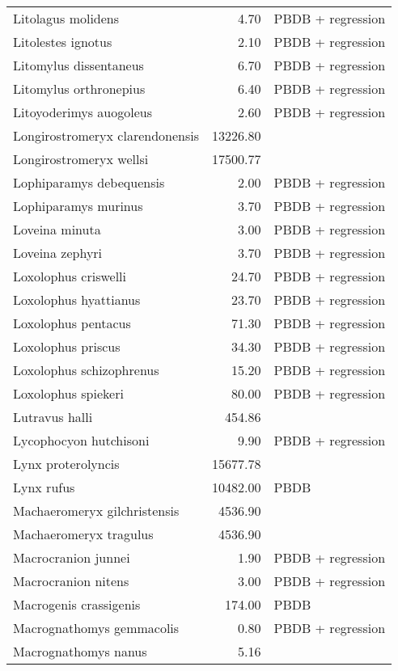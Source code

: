 \begin{table}[ht]
\begin{tabular}{lrl}
  Litolagus molidens & 4.70 & PBDB + regression \\ 
  Litolestes ignotus & 2.10 & PBDB + regression \\ 
  Litomylus dissentaneus & 6.70 & PBDB + regression \\ 
  Litomylus orthronepius & 6.40 & PBDB + regression \\ 
  Litoyoderimys auogoleus & 2.60 & PBDB + regression \\ 
  Longirostromeryx clarendonensis & 13226.80 & \cite{Tomiya2013} \\ 
  Longirostromeryx wellsi & 17500.77 & \cite{Tomiya2013} \\ 
  Lophiparamys debequensis & 2.00 & PBDB + regression \\ 
  Lophiparamys murinus & 3.70 & PBDB + regression \\ 
  Loveina minuta & 3.00 & PBDB + regression \\ 
  Loveina zephyri & 3.70 & PBDB + regression \\ 
  Loxolophus criswelli & 24.70 & PBDB + regression \\ 
  Loxolophus hyattianus & 23.70 & PBDB + regression \\ 
  Loxolophus pentacus & 71.30 & PBDB + regression \\ 
  Loxolophus priscus & 34.30 & PBDB + regression \\ 
  Loxolophus schizophrenus & 15.20 & PBDB + regression \\ 
  Loxolophus spiekeri & 80.00 & PBDB + regression \\ 
  Lutravus halli & 454.86 & \cite{Tomiya2013} \\ 
  Lycophocyon hutchisoni & 9.90 & PBDB + regression \\ 
  Lynx proterolyncis & 15677.78 & \cite{Tomiya2013} \\ 
  Lynx rufus & 10482.00 & PBDB \\ 
  Machaeromeryx gilchristensis & 4536.90 & \cite{Tomiya2013} \\ 
  Machaeromeryx tragulus & 4536.90 & \cite{Tomiya2013} \\ 
  Macrocranion junnei & 1.90 & PBDB + regression \\ 
  Macrocranion nitens & 3.00 & PBDB + regression \\ 
  Macrogenis crassigenis & 174.00 & PBDB \\ 
  Macrognathomys gemmacolis & 0.80 & PBDB + regression \\ 
  Macrognathomys nanus & 5.16 & \cite{Tomiya2013} \\ 

\end{tabular}
\end{table}
